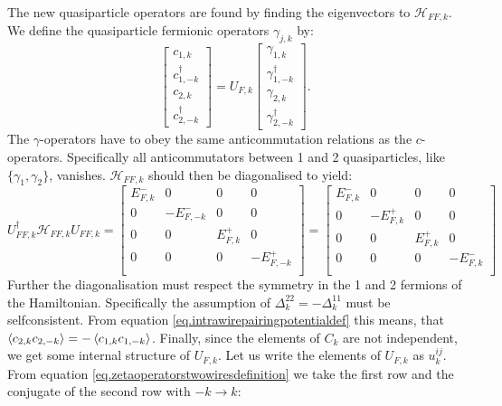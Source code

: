 The new quasiparticle operators are found by finding the eigenvectors to $\mathcal{H}_{FF,k}$. We define the quasiparticle fermionic operators $\gamma_{j,k}$ by:
\begin{equation}
\begin{bmatrix} c_{1,k} \\ c^\dagger_{1,-k} \\ c_{2,k} \\ c^\dagger_{2,-k} \end{bmatrix} = U_{F,k}\begin{bmatrix} \gamma_{1,k} \\ \gamma^{\dagger}_{1,-k} \\ \gamma_{2,k} \\ \gamma^{\dagger}_{2,-k} \end{bmatrix}.
\label{eq.zetaoperatorstwowiresdefinition}
\end{equation} 
The $\gamma$-operators have to obey the same anticommutation relations as the $c$-operators. Specifically all anticommutators between 1 and 2 quasiparticles, like $\{\gamma_1, \gamma_2 \} $, vanishes. $\mathcal{H}_{FF,k}$ should then be diagonalised to yield:
\begin{equation}
U^\dagger_{FF,k}\mathcal{H}_{FF,k}U_{FF,k} = \begin{bmatrix} 
E^{-}_{F,k} & 0        & 0       & 0        \\ 
0       & -E^{-}_{F,-k} & 0       & 0        \\ 
0       & 0        & E^{+}_{F,k} & 0        \\ 
0       & 0        & 0       & -E^{+}_{F,-k} \\ 
\end{bmatrix} = \begin{bmatrix} 
E^{-}_{F,k} & 0        & 0       & 0        \\ 
0       & -E^{+}_{F,k} & 0       & 0        \\ 
0       & 0        & E^{+}_{F,k} & 0        \\ 
0       & 0        & 0       & -E^{-}_{F,k} \\ 
\end{bmatrix} \nonumber
\end{equation}
Further the diagonalisation must respect the symmetry in the 1 and 2 fermions of the Hamiltonian. Specifically the assumption of $\Delta^{22}_k = -\Delta^{11}_k$ must be selfconsistent. From equation \ref{eq.intrawirepairingpotentialdef} this means, that $\braket{c_{2,k}c_{2,-k}} = -\braket{c_{1,k}c_{1,-k}}$. Finally, since the elements of $C_k$ are not independent, we get some internal structure of $U_{F,k}$. Let us write the elements of $U_{F,k}$ as $u^{ij}_k$. From equation \eqref{eq.zetaoperatorstwowiresdefinition} we take the first row and the conjugate of the second row with $-k \to k$:
